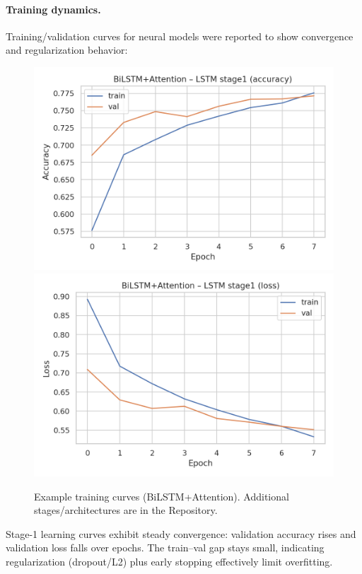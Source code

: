 \documentclass[10pt]{article}
\begin{document}
\paragraph{Training dynamics.}
Training/validation curves for neural models were reported to show convergence and regularization behavior:
\begin{figure}[H]
  \centering
  \includegraphics[width=.70\linewidth]{../SCRITPS/artifacts/figures/bilstm+attention_lstm_stage1_acc.png}
  \includegraphics[width=.70\linewidth]{../SCRITPS/artifacts/figures/bilstm+attention_lstm_stage1_loss.png}
  \caption{Example training curves (BiLSTM+Attention). Additional stages/architectures are in the Repository.}
  \label{fig:training-curves}
\end{figure}
Stage-1 learning curves exhibit steady convergence: validation accuracy rises and validation loss falls over epochs. The train–val gap stays small, indicating regularization (dropout/L2) plus early stopping effectively limit overfitting.
\end{document}
